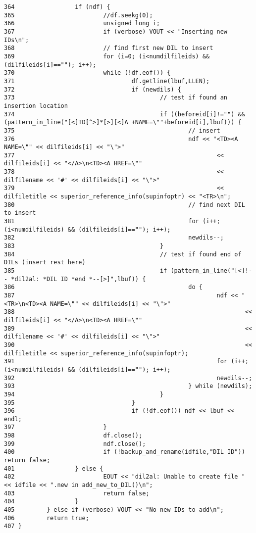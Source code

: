 \begin{verbatim}
364                 if (ndf) {
365                         //df.seekg(0);
366                         unsigned long i;
367                         if (verbose) VOUT << "Inserting new IDs\n";
368                         // find first new DIL to insert
369                         for (i=0; (i<numdilfileids) && (dilfileids[i]==""); i++);
370                         while (!df.eof()) {
371                                 df.getline(lbuf,LLEN);
372                                 if (newdils) {
373                                         // test if found an insertion location
374                                         if ((beforeid[i]!="") && (pattern_in_line("[<]TD[^>]*[>][<]A +NAME=\""+beforeid[i],lbuf))) {
375                                                 // insert
376                                                 ndf << "<TD><A NAME=\"" << dilfileids[i] << "\">"
377                                                         << dilfileids[i] << "</A>\n<TD><A HREF=\""
378                                                         << dilfilename << '#' << dilfileids[i] << "\">"
379                                                         << dilfiletitle << superior_reference_info(supinfoptr) << "<TR>\n";
380                                                 // find next DIL to insert
381                                                 for (i++; (i<numdilfileids) && (dilfileids[i]==""); i++);
382                                                 newdils--;
383                                         }
384                                         // test if found end of DILs (insert rest here)
385                                         if (pattern_in_line("[<]!-- *dil2al: *DIL ID *end *--[>]",lbuf)) {
386                                                 do {
387                                                         ndf << "<TR>\n<TD><A NAME=\"" << dilfileids[i] << "\">"
388                                                                 << dilfileids[i] << "</A>\n<TD><A HREF=\""
389                                                                 << dilfilename << '#' << dilfileids[i] << "\">"
390                                                                 << dilfiletitle << superior_reference_info(supinfoptr);
391                                                         for (i++; (i<numdilfileids) && (dilfileids[i]==""); i++);
392                                                         newdils--;
393                                                 } while (newdils);
394                                         }
395                                 }
396                                 if (!df.eof()) ndf << lbuf << endl;
397                         }
398                         df.close();
399                         ndf.close();
400                         if (!backup_and_rename(idfile,"DIL ID")) return false;
401                 } else {
402                         EOUT << "dil2al: Unable to create file " << idfile << ".new in add_new_to_DIL()\n";
403                         return false;
404                 }
405         } else if (verbose) VOUT << "No new IDs to add\n";
406         return true;
407 }
\end{verbatim}\normalsize 
{}
